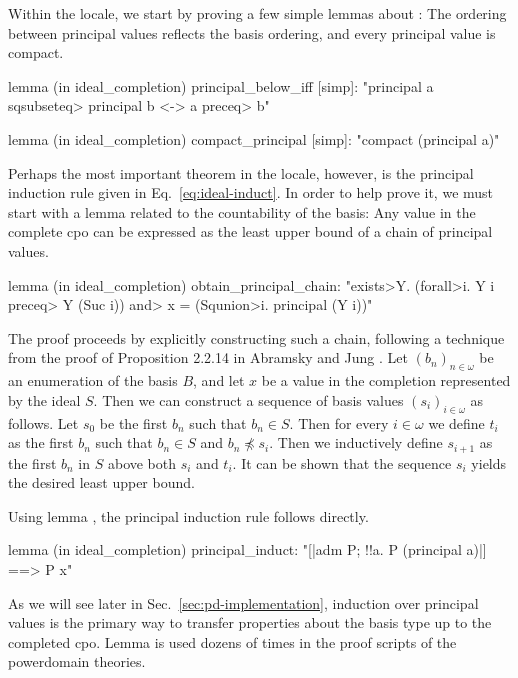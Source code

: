 %
Within the  locale, we start by proving a few simple lemmas about : The ordering between principal values reflects the basis ordering, and every principal value is compact.
%
\begin{isacode}
lemma (in ideal_completion) principal_below_iff [simp]:
  "principal a \<sqsubseteq> principal b <-> a \<preceq> b"
\end{isacode}
\unmedskip
{}
\begin{isacode}
lemma (in ideal_completion) compact_principal [simp]:
  "compact (principal a)"
\end{isacode}
%
Perhaps the most important theorem in the  locale, however, is the principal induction rule given in Eq.~\eqref{eq:ideal-induct}. In order to help prove it, we must start with a lemma related to the countability of the basis: Any value in the complete cpo can be expressed as the least upper bound of a chain of principal values.
%
\begin{isacode}
lemma (in ideal_completion) obtain_principal_chain:
  "\<exists>Y. (\<forall>i. Y i \<preceq> Y (Suc i)) \<and> x = (\<Squnion>i. principal (Y i))"
\end{isacode}
%
The proof proceeds by explicitly constructing such a chain, following a technique from the proof of Proposition 2.2.14 in Abramsky and Jung \cite{abramsky94domain}. Let $(b_n)_{n\in\omega}$ be an enumeration of the basis $B$, and let $x$ be a value in the completion represented by the ideal $S$. Then we can construct a sequence of basis values $(s_i)_{i\in\omega}$ as follows. Let $s_0$ be the first $b_n$ such that $b_n \in S$. Then for every $i\in\omega$ we define $t_i$ as the first $b_n$ such that $b_n \in S$ and $b_n \not\preceq s_i$. Then we inductively define $s_{i+1}$ as the first $b_n$ in $S$ above both $s_i$ and $t_i$. It can be shown that the sequence $s_i$ yields the desired least upper bound.

Using lemma , the principal induction rule follows directly.
%
\vspace{-22pt} %
\begin{isacode}
lemma (in ideal_completion) principal_induct:
  "[|adm P; !!a. P (principal a)|] ==> P x"
\end{isacode}
%
As we will see later in Sec.~\ref{sec:pd-implementation}, induction over principal values is the primary way to transfer properties about the basis type up to the completed cpo. Lemma  is used dozens of times in the proof scripts of the  powerdomain theories.

